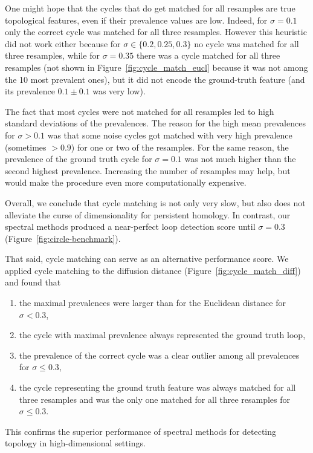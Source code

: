 \documentclass{article}
\theoremstyle{plain}
\theoremstyle{definition}
\theoremstyle{remark}
\begin{document}
One might hope that the cycles that do get matched for all resamples are true topological features, even if their prevalence values are low. Indeed, for $\sigma =0.1$ only the correct cycle was matched for all three resamples. However this heuristic did not work either because for $\sigma \in \{0.2, 0.25, 0.3\}$ no cycle was matched for all three resamples, while for $\sigma=0.35$ there was a cycle matched for all three resamples (not shown in Figure~\ref{fig:cycle_match_eucl} because it was not among the 10 most prevalent ones), but it did not encode the ground-truth feature (and its prevalence $0.1 \pm 0.1$ was very low). 

The fact that most cycles were not matched for all resamples led to high standard deviations of the prevalences. The reason for the high mean prevalences for $\sigma>0.1$ was that some noise cycles got matched with very high prevalence (sometimes $>0.9$) for one or two of the resamples. For the same reason, the prevalence of the ground truth cycle for $\sigma=0.1$ was not much higher than the second highest prevalence. Increasing the number of  resamples may help, but would make the procedure even more computationally expensive.

Overall, we conclude that cycle matching is not only very slow, but also does not alleviate the curse of dimensionality for persistent homology. In contrast, our spectral methods produced a near-perfect loop detection score until $\sigma=0.3$ (Figure~\ref{fig:circle-benchmark}).

That said, cycle matching can serve as an alternative performance score. We applied cycle matching to the diffusion distance (Figure~\ref{fig:cycle_match_diff}) and found that 
\begin{enumerate}[nosep, topsep=-0.5\parskip, leftmargin=0.5\leftmargin]
    \item the maximal prevalences were larger than for the Euclidean distance for $\sigma < 0.3$,
    \item the cycle with maximal prevalence always represented the ground truth loop,
    \item the prevalence of the correct cycle was a clear outlier among all prevalences for $\sigma \leq 0.3$,
    \item the cycle representing the ground truth feature was always matched for all three resamples and was the only one matched for all three resamples for $\sigma\leq 0.3$.
\end{enumerate}

This confirms the superior performance of spectral methods for detecting topology in high-dimensional settings.
\end{document}
